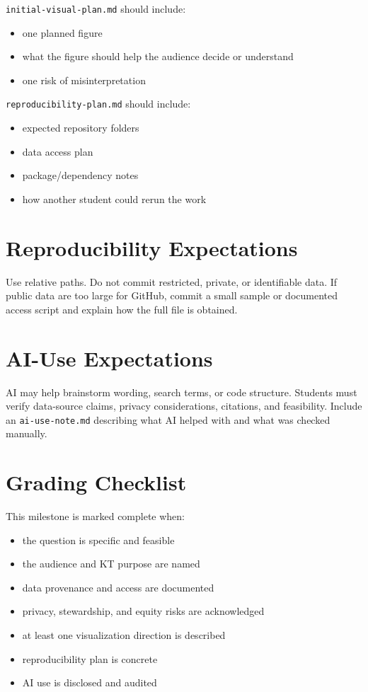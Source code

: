 \documentclass[
  letterpaper,
  DIV=11,
  numbers=noendperiod,
  oneside]{scrreprt}
\providecommand{\tightlist}{%
  \setlength{\itemsep}{0pt}\setlength{\parskip}{0pt}}
\begin{document}
\texttt{initial-visual-plan.md} should include:

\begin{itemize}
\tightlist
\item
  one planned figure
\item
  what the figure should help the audience decide or understand
\item
  one risk of misinterpretation
\end{itemize}

\texttt{reproducibility-plan.md} should include:

\begin{itemize}
\tightlist
\item
  expected repository folders
\item
  data access plan
\item
  package/dependency notes
\item
  how another student could rerun the work
\end{itemize}

\section{Reproducibility
Expectations}\label{reproducibility-expectations-3}

Use relative paths. Do not commit restricted, private, or identifiable
data. If public data are too large for GitHub, commit a small sample or
documented access script and explain how the full file is obtained.

\section{AI-Use Expectations}\label{ai-use-expectations-12}

AI may help brainstorm wording, search terms, or code structure.
Students must verify data-source claims, privacy considerations,
citations, and feasibility. Include an \texttt{ai-use-note.md}
describing what AI helped with and what was checked manually.

\section{Grading Checklist}\label{grading-checklist-11}

This milestone is marked complete when:

\begin{itemize}
\tightlist
\item
  the question is specific and feasible
\item
  the audience and KT purpose are named
\item
  data provenance and access are documented
\item
  privacy, stewardship, and equity risks are acknowledged
\item
  at least one visualization direction is described
\item
  reproducibility plan is concrete
\item
  AI use is disclosed and audited
\end{itemize}
\end{document}
